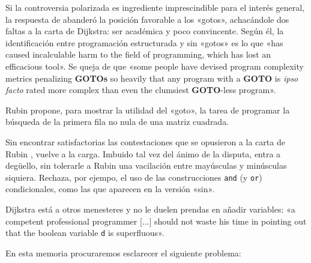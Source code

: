 \documentclass{tfg_domingo}
\begin{document}
Si la controversia polarizada es ingrediente imprescindible
para el interés general, la respuesta de \citet{1987_Rubin}
abanderó la posición favorable a los «gotos», achacándole
dos faltas a la carta de Dijkstra: ser académica y poco
convincente. Según él, la identificación entre programación
estructurada y sin «gotos» es lo que «has caused
incalculable harm to the field of programming, which has
lost an efficacious tool». Se queja de que «some people have
devised program complexity metrics penalizing \textbf{GOTOs}
so heavily that any program with a \textbf{GOTO} is
\emph{ipso facto} rated more complex than even the clumsiest
\textbf{GOTO}-less program».

Rubin propone, para mostrar la utilidad del «goto», la tarea
de programar la búsqueda de la primera fila no nula de una
matriz cuadrada.

\hfill
{}

%

Sin encontrar satisfactorias las contestaciones que se
opusieron a la carta de Rubin \citep{1987_Moore},
\citet{1987_Dijkstra} vuelve a la carga. Imbuido tal vez del
ánimo de la dispu\-ta, entra a degüello, sin tolerarle a
Rubin una vacilación entre mayúsculas y minúsculas
siquiera. Rechaza, por ejempo, el uso de las construcciones
{\tt and} (y {\tt or}) condicionales, como las que aparecen
en la versión «sin».

Dijkstra está a otros menesteres y no le duelen prendas en
añadir variables: «a competent professional programmer [...]
should not waste his time in pointing out that the boolean
variable \texttt{d} is superfluous».

\begin{center}
\end{center}

En esta memoria procuraremos esclarecer el siguiente problema:
\end{document}
